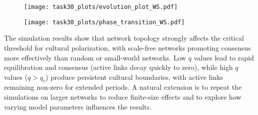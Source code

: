 \begin{figure}[htbp]
    \centering
    \begin{minipage}{0.58\textwidth}
        \centering
        \texttt{[image: task30\_plots/evolution\_plot\_WS.pdf]}
    \end{minipage}
    \hfill
    \begin{minipage}{0.4\textwidth}
        \centering
        \texttt{[image: task30\_plots/phase\_transition\_WS.pdf]}
    \end{minipage}
\end{figure}
The simulation results show that network topology strongly affects the critical threshold for cultural polarization, with scale-free networks promoting consensus more effectively than random or small-world networks. Low $q$ values lead to rapid equilibration and consensus (active links decay quickly to zero), while high $q$ values ($q > q_c$) produce persistent cultural boundaries, with active links remaining non-zero for extended periods. A natural extension is to repeat the simulations on larger networks to reduce finite-size effects and to explore how varying model parameters influences the results.



\newpage